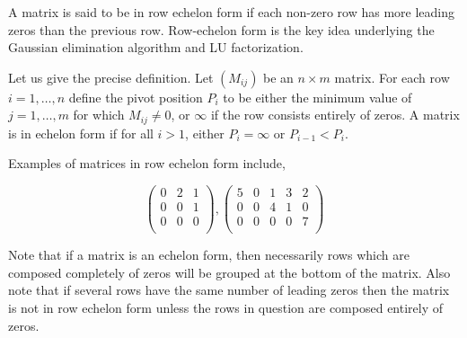 \documentclass[12pt]{article}
\begin{document}
A matrix is said to be in row echelon form if each non-zero row has more leading zeros than the previous row.   Row-echelon form is the key idea underlying the Gaussian elimination algorithm and LU factorization.

Let us give the precise definition.  Let $(M_{ij})$ be an $n\times m$
matrix. For each row $i=1,\ldots,n$ define the pivot position $P_i$ to
be either the minimum value of $j=1,\ldots, m$ for which $M_{ij}\neq
0$, or $\infty$ if the row consists entirely of zeros.  A matrix is in
echelon form if for all $i>1$, either $P_i=\infty$ or $P_{i-1}<P_i$.

Examples of matrices in row echelon form include,

\begin{displaymath}
\left( \begin{array}{ccc}
 0 & 2 & 1 \\
 0 & 0 & 1 \\
 0 & 0 & 0 \\
\end{array}
\right)
,\left( \begin{array}{ccccc}
 5 & 0 & 1 & 3 & 2 \\
 0 & 0 & 4 & 1 & 0 \\
 0 & 0 & 0 & 0 & 7 \\
\end{array} \right)
\end{displaymath}

Note that if a matrix is an echelon form, then necessarily rows which
are composed completely of zeros will be grouped at the bottom of the
matrix.  Also note that if several rows have the same number of
leading zeros then the matrix is not in row echelon form unless the
rows in question are composed entirely of zeros.
\end{document}
